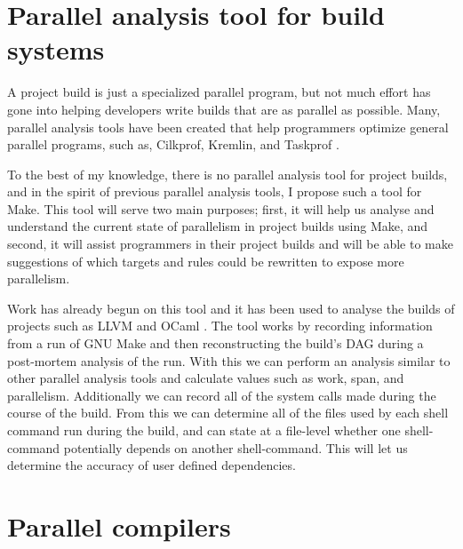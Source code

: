 \documentclass[10pt]{article}
\begin{document}
\section{Parallel analysis tool for build systems}
\label{sec:build}

A project build is just a specialized parallel program, but not much effort has gone
into helping developers write builds that are as parallel as possible.  Many, parallel
analysis tools have been created that help programmers optimize general parallel programs,
such as, Cilkprof, Kremlin, and Taskprof \cite{schardl2015cilkprof, garcia2011kremlin, yoga2017fast}.

To the best of my knowledge, there is no parallel analysis tool for project builds, and in the
spirit of previous parallel analysis tools, I propose such a tool for Make.  This tool will
serve two main purposes; first, it will help us analyse and understand the current state of
parallelism in project builds using Make, and second, it will assist programmers in their project
builds and will be able to make suggestions of which targets and rules could be rewritten to
expose more parallelism.

Work has already begun on this tool and it has been used to analyse the builds of
projects such as LLVM \cite{lattner2002llvm} and OCaml \cite{ocaml}.  The tool works by
recording information from a run of GNU Make and then reconstructing the build's DAG
during a post-mortem analysis of the run.  With this we can perform an analysis similar
to other parallel analysis tools and calculate values such as work, span, and
parallelism.
Additionally we can record all of the system calls made during the course of the build.
From this we can determine all of the files used by each shell command run during the build, and
can state at a file-level whether one shell-command potentially depends on another shell-command.
This will let us determine the accuracy of user defined dependencies.

\section{Parallel compilers}

\end{document}
